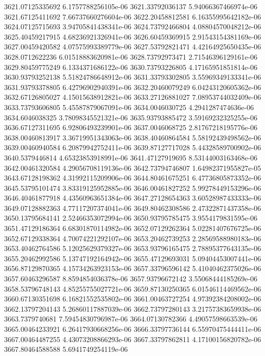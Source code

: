 {3621.07125335692 6.1757788256105e-06
3621.33792036137 5.94066367466974e-06
3621.67125411692 7.66737660276604e-06
3622.20458812581 6.16355995642182e-06
3624.07125715693 3.94705841438341e-06
3624.73792466804 4.08804570048212e-06
3625.40459217915 4.68236921326941e-06
3626.60459369915 2.91543154381169e-06
3627.00459420582 4.07575993389779e-06
3627.53792821471 4.42164925650435e-06
3628.0712622236 6.01518883620981e-06
3628.73792973471 2.71546396129161e-06
3629.80459775249 6.1334371686122e-06
3630.73793226805 4.17165951851814e-06
3630.93793252138 5.51824786648912e-06
3631.33793302805 3.55969349133341e-06
3631.93793378805 6.42796902940391e-06
3632.20460079249 6.04243120605362e-06
3632.67126805027 4.15015638912821e-06
3633.27126881027 7.08953744032409e-06
3633.73793606805 5.45587879067091e-06
3634.0046030725 4.2941287474636e-06
3634.6046038325 3.78098345521321e-06
3635.93793885472 3.59169232325255e-06
3636.67127311695 6.92806493239901e-06
3637.0046068725 2.81767218195776e-06
3638.00460813917 3.36719951343063e-06
3638.40460864584 5.58192439498562e-06
3639.00460940584 6.20879942752411e-06
3639.87127717028 5.44328589700902e-06
3640.5379446814 4.65323853918991e-06
3641.47127919695 8.53144003163468e-06
3642.00461320584 4.29056708119136e-06
3642.73794746807 1.64982371955827e-05
3643.67128198362 4.31992115209906e-06
3644.80461675251 6.47736805873352e-06
3645.53795101474 3.83319125952885e-06
3646.00461827252 5.99278449153296e-06
3646.40461877918 4.43560963651384e-06
3647.27128654363 3.60528987433333e-06
3649.07128882363 4.77117207374041e-06
3649.80462308586 2.47322871437358e-06
3650.13795684141 2.52466353072994e-06
3650.93795785475 3.9554179831595e-06
3651.47129186364 6.68301870114982e-06
3652.07129262364 5.02281407676725e-06
3652.67129338364 4.70074221292107e-06
3653.20462739253 2.28569588980183e-06
3653.40462764586 5.12025629379327e-06
3653.93796165475 2.78895377643135e-06
3655.20462992586 5.13747192164942e-06
3655.47129693031 5.09404453007441e-06
3656.87129870365 4.15734263923153e-06
3657.33796596142 5.41040462375026e-06
3657.60463296587 8.8594854036378e-06
3657.93796672142 3.55068444185269e-06
3658.53796748143 4.85255755027721e-06
3659.87130250365 6.01546114469562e-06
3660.67130351698 6.16821552535802e-06
3661.00463727254 4.97392384208002e-06
3662.13797204143 5.26860117887039e-06
3662.73797280143 3.21757383659938e-06
3663.7379740681 7.59454830796987e-06
3664.07130782366 4.49057598663539e-06
3665.00464233921 6.26417930668256e-06
3666.33797736144 6.55970475444411e-06
3667.00464487255 4.43073208866293e-06
3667.33797862811 4.17100156820782e-06
3667.80464588588 5.6941749254119e-06
}
